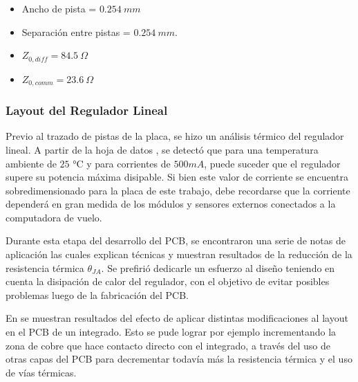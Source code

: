 \begin{itemize}
    \item Ancho de pista = $0.254 \ mm$
    \item Separación entre pistas = $0.254 \ mm$.
    \item $Z_{0,diff} = 84.5 \ \Omega$
    \item $Z_{0,comm} = 23.6 \ \Omega$
\end{itemize} 

\subsubsection{Layout del Regulador Lineal}


Previo al trazado de pistas de la placa, se hizo un análisis térmico del regulador lineal. A partir de la hoja de datos \cite{ZLDO1117QG33TA}, se detectó que para una temperatura ambiente de $25$ °C y para corrientes de $500 mA$, puede suceder que el regulador supere su potencia máxima disipable. Si bien este valor de corriente se encuentra sobredimensionado para la placa de este trabajo, debe recordarse que la corriente dependerá en gran medida de los módulos y sensores externos conectados a la computadora de vuelo.


Durante esta etapa del desarrollo del PCB, se encontraron una serie de notas de aplicación las cuales explican técnicas y muestran resultados de la reducción de la resistencia térmica $\theta_{JA}$. Se prefirió dedicarle un esfuerzo al diseño teniendo en cuenta la disipación de calor del regulador, con el objetivo de evitar posibles problemas luego de la fabricación del PCB.

En \cite{ROHM_thermal} se muestran resultados del efecto de aplicar distintas modificaciones al layout en el PCB de un integrado. Esto se pude lograr por ejemplo incrementando la zona de cobre que hace contacto directo con el integrado, a través del uso de otras capas del PCB para decrementar todavía más la resistencia térmica y el uso de vías térmicas.

